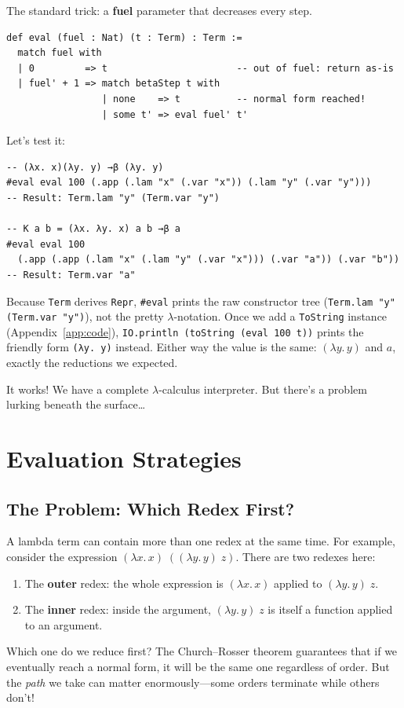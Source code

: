 \documentclass[11pt,a4paper]{article}
\theoremstyle{definition}
\newcommand{\lam}{\lambda}
\begin{document}
The standard trick: a \textbf{fuel} parameter that decreases every step.

\begin{verbatim}
def eval (fuel : Nat) (t : Term) : Term :=
  match fuel with
  | 0         => t                       -- out of fuel: return as-is
  | fuel' + 1 => match betaStep t with
                 | none    => t          -- normal form reached!
                 | some t' => eval fuel' t'
\end{verbatim}

Let's test it:

\begin{verbatim}
-- (λx. x)(λy. y) →β (λy. y)
#eval eval 100 (.app (.lam "x" (.var "x")) (.lam "y" (.var "y")))
-- Result: Term.lam "y" (Term.var "y")

-- K a b = (λx. λy. x) a b →β a
#eval eval 100
  (.app (.app (.lam "x" (.lam "y" (.var "x"))) (.var "a")) (.var "b"))
-- Result: Term.var "a"
\end{verbatim}

Because \texttt{Term} derives \texttt{Repr}, \texttt{\#eval} prints the raw
constructor tree (\texttt{Term.lam "y" (Term.var "y")}), not the pretty
$\lam$-notation. Once we add a \texttt{ToString} instance
(Appendix~\ref{app:code}), \texttt{IO.println (toString (eval 100 t))} prints
the friendly form \texttt{(λy. y)} instead. Either way the value is the same:
$(\lam y.\, y)$ and $a$, exactly the reductions we expected.

It works! We have a complete $\lam$-calculus interpreter. But there's a problem
lurking beneath the surface\ldots

\section{Evaluation Strategies}\label{sec:strategies}

\subsection{The Problem: Which Redex First?}

A lambda term can contain more than one redex at the same time. For example,
consider the expression $(\lam x.\, x)\;((\lam y.\, y)\; z)$. There are two
redexes here:
\begin{enumerate}[leftmargin=2em]
\item The \textbf{outer} redex: the whole expression is $(\lam x.\, x)$ applied
  to $(\lam y.\, y)\; z$.
\item The \textbf{inner} redex: inside the argument, $(\lam y.\, y)\; z$ is
  itself a function applied to an argument.
\end{enumerate}
Which one do we reduce first? The Church--Rosser theorem guarantees that if we
eventually reach a normal form, it will be the same one regardless of order.
But the \emph{path} we take can matter enormously---some orders terminate while
others don't!
\end{document}

